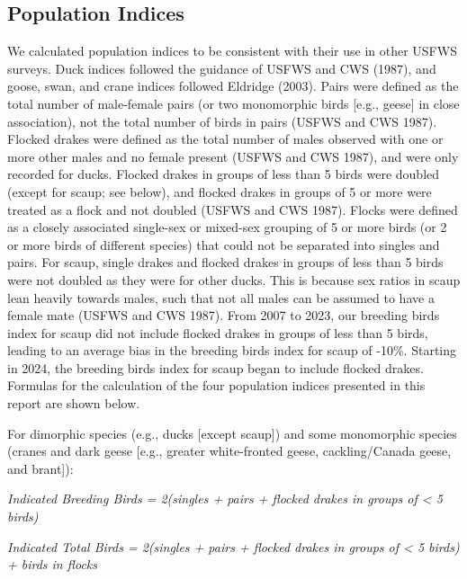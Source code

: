 \documentclass[
]{article}
\begin{document}
\endgroup{}

\subsection*{Population Indices}\label{population-indices}

We calculated population indices to be consistent with their use in
other USFWS surveys. Duck indices followed the guidance of USFWS and CWS
(1987), and goose, swan, and crane indices followed Eldridge (2003).
Pairs were defined as the total number of male-female pairs (or two
monomorphic birds {[}e.g., geese{]} in close association), not the total
number of birds in pairs (USFWS and CWS 1987). Flocked drakes were
defined as the total number of males observed with one or more other
males and no female present (USFWS and CWS 1987), and were only recorded
for ducks. Flocked drakes in groups of less than 5 birds were doubled
(except for scaup; see below), and flocked drakes in groups of 5 or more
were treated as a flock and not doubled (USFWS and CWS 1987). Flocks
were defined as a closely associated single-sex or mixed-sex grouping of
5 or more birds (or 2 or more birds of different species) that could not
be separated into singles and pairs. For scaup, single drakes and
flocked drakes in groups of less than 5 birds were not doubled as they
were for other ducks. This is because sex ratios in scaup lean heavily
towards males, such that not all males can be assumed to have a female
mate (USFWS and CWS 1987). From 2007 to 2023, our breeding birds index
for scaup did not include flocked drakes in groups of less than 5 birds,
leading to an average bias in the breeding birds index for scaup of
-10\%. Starting in 2024, the breeding birds index for scaup began to
include flocked drakes. Formulas for the calculation of the four
population indices presented in this report are shown below.

For dimorphic species (e.g., ducks {[}except scaup{]}) and some
monomorphic species (cranes and dark geese {[}e.g., greater
white-fronted geese, cackling/Canada geese, and brant{]}):

\begin{center}

\textit{Indicated Breeding Birds = 2(singles + pairs + flocked drakes in groups of < 5 birds)} \newline

\textit{Indicated Total Birds = 2(singles + pairs + flocked drakes in groups of < 5 birds) + birds in flocks} \newline

\end{center}
\end{document}
